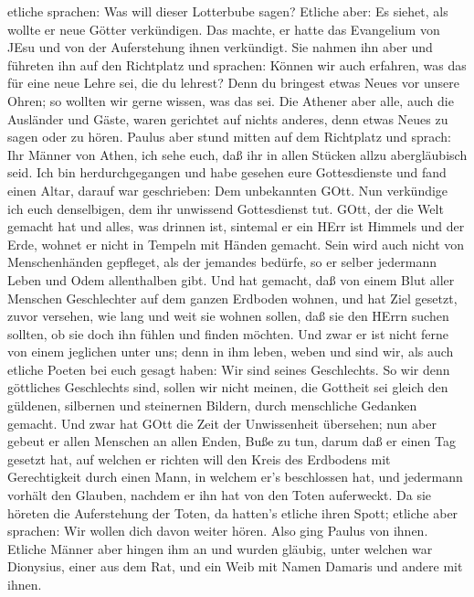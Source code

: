 etliche sprachen: Was will dieser Lotterbube sagen? Etliche aber: Es
siehet, als wollte er neue Götter verkündigen. Das machte, er hatte das
Evangelium von JEsu und von der Auferstehung ihnen verkündigt.
 Sie nahmen ihn aber und führeten ihn auf den Richtplatz
und sprachen: Können wir auch erfahren, was das für eine neue Lehre sei,
die du lehrest?  Denn du bringest etwas Neues vor unsere
Ohren; so wollten wir gerne wissen, was das sei.  Die
Athener aber alle, auch die Ausländer und Gäste, waren gerichtet auf
nichts anderes, denn etwas Neues zu sagen oder zu hören. 
Paulus aber stund mitten auf dem Richtplatz und sprach: Ihr Männer von
Athen, ich sehe euch, daß ihr in allen Stücken allzu abergläubisch seid.
 Ich bin herdurchgegangen und habe gesehen eure
Gottesdienste und fand einen Altar, darauf war geschrieben: Dem
unbekannten GOtt. Nun verkündige ich euch denselbigen, dem ihr unwissend
Gottesdienst tut.  GOtt, der die Welt gemacht hat und
alles, was drinnen ist, sintemal er ein HErr ist Himmels und der Erde,
wohnet er nicht in Tempeln mit Händen gemacht.  Sein wird
auch nicht von Menschenhänden gepfleget, als der jemandes bedürfe, so er
selber jedermann Leben und Odem allenthalben gibt.  Und hat
gemacht, daß von einem Blut aller Menschen Geschlechter auf dem ganzen
Erdboden wohnen, und hat Ziel gesetzt, zuvor versehen, wie lang und weit
sie wohnen sollen,  daß sie den HErrn suchen sollten, ob
sie doch ihn fühlen und finden möchten. Und zwar er ist nicht ferne von
einem jeglichen unter uns;  denn in ihm leben, weben und
sind wir, als auch etliche Poeten bei euch gesagt haben: Wir sind seines
Geschlechts.  So wir denn göttliches Geschlechts sind,
sollen wir nicht meinen, die Gottheit sei gleich den güldenen, silbernen
und steinernen Bildern, durch menschliche Gedanken gemacht.
 Und zwar hat GOtt die Zeit der Unwissenheit übersehen; nun
aber gebeut er allen Menschen an allen Enden, Buße zu tun, 
darum daß er einen Tag gesetzt hat, auf welchen er richten will den
Kreis des Erdbodens mit Gerechtigkeit durch einen Mann, in welchem er's
beschlossen hat, und jedermann vorhält den Glauben, nachdem er ihn hat
von den Toten auferweckt.  Da sie höreten die Auferstehung
der Toten, da hatten's etliche ihren Spott; etliche aber sprachen: Wir
wollen dich davon weiter hören.  Also ging Paulus von
ihnen.  Etliche Männer aber hingen ihm an und wurden
gläubig, unter welchen war Dionysius, einer aus dem Rat, und ein Weib
mit Namen Damaris und andere mit ihnen.


